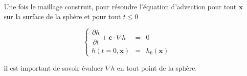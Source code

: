 Une fois le maillage construit, pour résoudre l'équation d'advection pour tout $\mathbf{x}$ sur la surface de la sphère et pour tout $t \leq 0$ 

\begin{equation}
  \left\{
  \begin{array}{rcl}
    \dfrac{\partial h}{\partial t} + \mathbf{c} \cdot \nabla h & = & 0 \\
    h(t=0, \mathbf{x}) & = & h_0(\mathbf{x})  
  \end{array}
  \right.
  \label{advection}
\end{equation}

il est important de savoir évaluer $\nabla h$ en tout point de la sphère.


